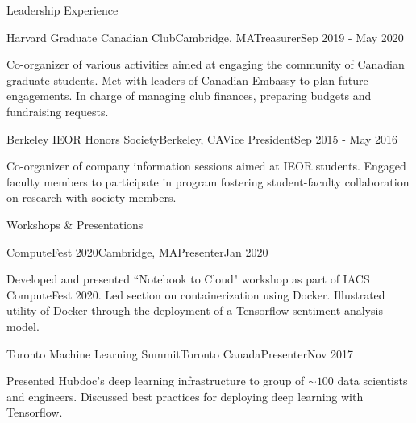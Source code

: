 \documentclass{resume} %
\begin{document}

\begin{rSection}{Leadership Experience}

\begin{rSubsection}{Harvard Graduate Canadian Club}{Cambridge, MA}{Treasurer}{Sep 2019 - May 2020}

\item Co-organizer of various activities aimed at engaging the community of Canadian graduate students. Met with leaders of Canadian Embassy to plan future engagements. In charge of managing club finances, preparing budgets and fundraising requests.  

\end{rSubsection}

\begin{rSubsection}{Berkeley IEOR Honors Society}{Berkeley, CA}{Vice President}{Sep 2015 - May 2016}

\item Co-organizer of company information sessions aimed at IEOR students. Engaged faculty members to participate in program fostering student-faculty collaboration on research with society members.

\end{rSubsection}

\end{rSection}



\begin{rSection}{Workshops \& Presentations}

\begin{rSubsection}{ComputeFest 2020}{Cambridge, MA}{Presenter}{Jan 2020}

\item Developed and presented ``Notebook to Cloud" workshop as part of IACS ComputeFest 2020. Led section on containerization using Docker. Illustrated utility of Docker through the deployment of a Tensorflow sentiment analysis model.

\end{rSubsection}

\begin{rSubsection}{Toronto Machine Learning Summit}{Toronto Canada}{Presenter}{Nov 2017}

\item Presented Hubdoc's deep learning infrastructure to group of $\sim 100$ data scientists and engineers. Discussed best practices for deploying deep learning with Tensorflow. 

\end{rSubsection}

\end{rSection}
\end{document}
